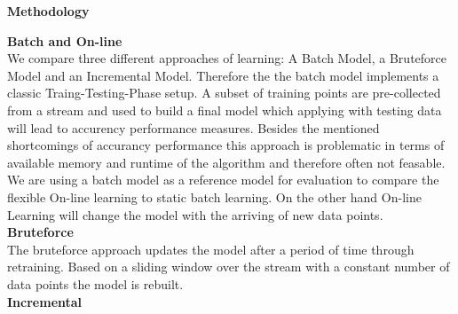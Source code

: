 \begin{center} \textbf{\huge Methodology} \end{center}
\textbf{\large Batch and On-line}\\
We compare three different approaches of learning: A Batch Model, a Bruteforce Model and an Incremental Model. Therefore the 
the batch model implements a classic Traing-Testing-Phase setup. A subset of training points are pre-collected from a stream and used to build a final model which applying with testing data will lead to accurency performance measures. Besides the mentioned shortcomings of accurancy performance this approach is problematic in terms of available memory and runtime of the algorithm and therefore often not feasable. We are using a batch model as a reference model for evaluation to compare the flexible On-line learning to static batch learning. On the other hand On-line Learning will change the model with the arriving of new data points.\\
\textbf{\large Bruteforce}\\
The bruteforce approach updates the model after a period of time through retraining. Based on a sliding window over the stream with a constant number of data points the model is rebuilt.\\
\textbf{\large Incremental}\\

